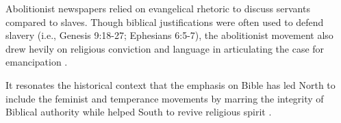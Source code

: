 \documentclass[11pt]{article}
\begin{document}

Abolitionist newspapers relied on evangelical rhetoric to discuss servants compared to slaves. Though biblical justifications were often used to defend slavery (i.e., Genesis 9:18-27; Ephesians 6:5-7), the abolitionist movement also drew hevily on religious conviction and language in articulating the case for emancipation \citep{rae_great_2018}.

It resonates the historical context that the emphasis on Bible has led North to include the feminist and temperance movements by marring the integrity of Biblical authority while helped South to revive religious spirit \citep{lloyd_slavery_1939}. 
\end{document}
